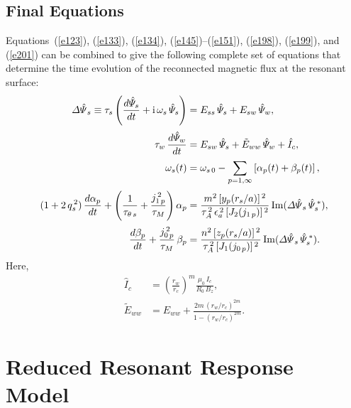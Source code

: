 \documentclass[notitlepage,12pt]{article}
\begin{document}
\subsection{Final Equations}
Equations~(\ref{e123}), (\ref{e133}), (\ref{e134}),  (\ref{e145})--(\ref{e151}), (\ref{e198}), (\ref{e199}), and (\ref{e201})
can be combined to give the following complete set of equations that determine the time evolution of the reconnected 
magnetic flux at the resonant surface:
\begin{align}\label{e202}
{\mit\Delta\hat{\Psi}}_s\equiv \tau_s\left(\frac{d\hat{\mit\Psi}_s}{dt} + {\rm i}\,\omega_s\,\hat{\mit\Psi}_s\right) &= E_{ss}\,\hat{\mit\Psi}_s + E_{sw}\,\hat{\mit\Psi}_w,\\[0.5ex]
\tau_w\,\frac{d\hat{\mit\Psi}_w}{dt} &= E_{sw}\,\hat{\mit\Psi}_s +\tilde{E}_{ww}\,\hat{\mit\Psi}_w
+\hat{I}_c,\label{e203}\\[0.5ex]
\omega_s(t)& = \omega_{s\,0} - \sum_{p=1,\infty}\left[\alpha_p(t)+\beta_p(t)\right],\\[0.5ex]
(1+2\,q_s^{\,2})\,\frac{d\alpha_p}{dt} + \left(\frac{1}{\tau_{\theta\,s}}+\frac{j_{1\,p}^{\,2}}{\tau_{M}}\right)\alpha_p
&= \frac{m^{2}\,[y_p(r_s/a)]^{\,2}}{\tau_A^{\,2}\,\epsilon_a^{\,2}\,[J_2(j_{1\,p})]^{\,2}}
\,{\rm Im}({\mit\Delta\hat{\Psi}}_s\,\hat{\mit\Psi}_s^{\,\ast}),\label{e205}\\[0.5ex]
\frac{d\beta_p}{dt} + \frac{j_{0\,p}^{\,2}}{\tau_{M}}\,\beta_p
&= \frac{n^{2}\,[z_p(r_s/a)]^{\,2}}{\tau_A^{\,2}\,[J_1(j_{0\,p})]^{\,2}}\,
{\rm Im}({\mit\Delta\hat{\Psi}}_s\,\hat{\mit\Psi}_s^{\,\ast}).\label{e206}
\end{align}
Here, 
\begin{align}
\hat{I}_c &= \left(\frac{r_w}{r_c}\right)^m\frac{\mu_0\,I_c}{R_0\,B_z},\\[0.5ex]
\tilde{E}_{ww} &= E_{ww} + \frac{2m\,(r_w/r_c)^{2m}}{1-(r_w/r_c)^{2m}}.\label{e208}
\end{align}

\section{Reduced Resonant  Response Model}\label{ff}
\end{document}
